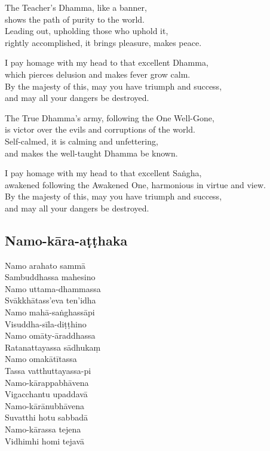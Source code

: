 The Teacher's Dhamma, like a banner,\\
shows the path of purity to the world.\\
Leading out, upholding those who uphold it,\\
rightly accomplished, it brings pleasure, makes peace.

I pay homage with my head to that excellent Dhamma,\\
which pierces delusion and makes fever grow calm.\\
By the majesty of this, may you have triumph and success,\\
and may all your dangers be destroyed.

The True Dhamma's army, following the One Well-Gone,\\
is victor over the evils and corruptions of the world.\\
Self-calmed, it is calming and unfettering,\\
and makes the well-taught Dhamma be known.

I pay homage with my head to that excellent Saṅgha,\\
awakened following the Awakened One, harmonious in virtue and view.\\
By the majesty of this, may you have triumph and success,\\
and may all your dangers be destroyed.

\subsection{Namo-kāra-aṭṭhaka}
\label{namo-arahato}


\begin{paritta}
  Namo arahato sammā\\
  Sambuddhassa mahesino\\
  Namo uttama-dhammassa\\
  Svākkhātass'eva ten'idha\\
  Namo mahā-saṅghassāpi\\
  Visuddha-sīla-diṭṭhino\\
  Namo omāty-āraddhassa\\
  Ratanattayassa sādhukaṃ\\
  Namo omakātītassa\\
  Tassa vatthuttayassa-pi\\
  Namo-kārappabhāvena\\
  Vigacchantu upaddavā\\
  Namo-kārānubhāvena\\
  Suvatthi hotu sabbadā\\
  Namo-kārassa tejena\\
  Vidhimhi homi tejavā
\end{paritta}

